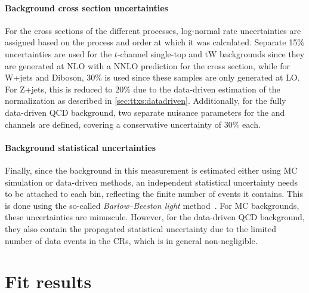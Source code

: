 \paragraph{Background cross section uncertainties}

For the cross sections of the different processes, log-normal rate uncertainties are assigned based on the process and order at which it was calculated. Separate 15\% uncertainties are used for the $t$-channel single-top and tW backgrounds since they are generated at NLO with a NNLO prediction for the cross section, while
for W+jets and Diboson, 30\% is used since these samples are only generated at LO. For Z+jets, this is reduced to 20\% due to the data-driven estimation of the normalization as described in \cref{sec:ttxs:datadriven}.
Additionally, for the fully data-driven QCD background, two separate nuisance parameters for the \ejets and \mujets channels are defined, covering a conservative uncertainty of 30\% each.

\paragraph{Background statistical uncertainties}

Finally, since the background in this measurement is estimated either using MC simulation or data-driven methods, an independent statistical uncertainty needs to be attached to each bin, reflecting the finite number of events it contains. This is done using the so-called \textit{Barlow--Beeston light} method~\cite{Barlow:1993dm}. For MC backgrounds, these uncertainties are minuscule. However, for the data-driven QCD background, they also contain the propagated statistical uncertainty due to the limited number of data events in the CRs, which is in general non-negligible.


\section{Fit results}
\label{sec:ttxs:fitresults}

